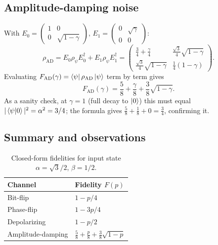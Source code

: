 \documentclass[11pt]{article}
\begin{document}
\subsection{Amplitude-damping noise}

With $E_0=\begin{pmatrix}1&0\\0&\sqrt{1-\gamma}\end{pmatrix}$, $E_1=\begin{pmatrix}0&\sqrt\gamma\\0&0\end{pmatrix}$:
\begin{equation}
\rho_{\text{AD}} = E_0\rho_\psi E_0^\dagger + E_1\rho_\psi E_1^\dagger = \begin{pmatrix}\tfrac34+\tfrac{\gamma}{4} & \tfrac{\sqrt3}{4}\sqrt{1-\gamma}\\ \tfrac{\sqrt3}{4}\sqrt{1-\gamma} & \tfrac14(1-\gamma)\end{pmatrix}.
\label{eq:ad-rho}
\end{equation}
Evaluating $F_{\text{AD}}(\gamma)=\bra{\psi}\rho_{\text{AD}}\ket{\psi}$ term by term gives
\begin{equation}
F_{\text{AD}}(\gamma) = \frac58 + \frac{\gamma}{8} + \frac{3}{8}\sqrt{1-\gamma}.
\label{eq:F-AD}
\end{equation}
As a sanity check, at $\gamma=1$ (full decay to $\ket{0}$) this must equal $|\braket{\psi}{0}|^2=\alpha^2=3/4$; the formula gives $\tfrac58+\tfrac18+0=\tfrac34$, confirming it.

\subsection{Summary and observations}

\begin{table}[H]
\centering
\caption{Closed-form fidelities for input state $\alpha=\sqrt3/2$, $\beta=1/2$.}
\label{tab:closed-form}
\begin{tabular}{ll}
\toprule
Channel & Fidelity $F(p)$ \\
\midrule
Bit-flip & $1-p/4$ \\
Phase-flip & $1-3p/4$ \\
Depolarizing & $1-p/2$ \\
Amplitude-damping & $\tfrac58+\tfrac{p}{8}+\tfrac38\sqrt{1-p}$ \\
\bottomrule
\end{tabular}
\end{table}
\end{document}
